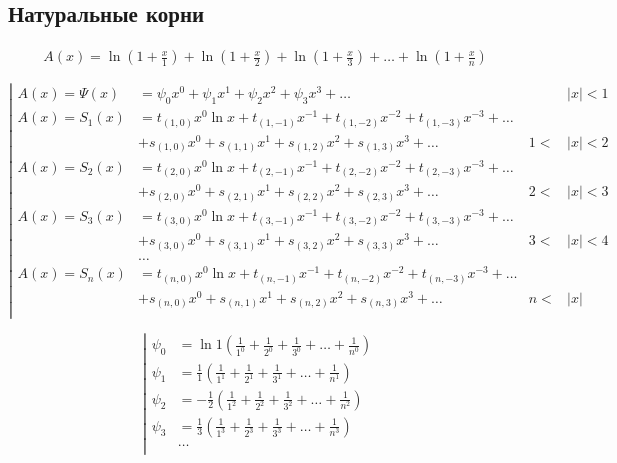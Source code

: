 
\subsection{Натуральные корни}

\begin{equation*} \begin{aligned}
&A(x) =
  \ln{\left(1 + \frac{x}{1} \right)}
+ \ln{\left(1 + \frac{x}{2} \right)}
+ \ln{\left(1 + \frac{x}{3} \right)}
+ \ldots
+ \ln{\left(1 + \frac{x}{n} \right)}
\end{aligned} \end{equation*}

\begin{equation*} \left| \begin{aligned}
A(x) = \Psi(x) &=
  \psi_0 x^0
+ \psi_1 x^1
+ \psi_2 x^2
+ \psi_3 x^3
+ \ldots &
&|x| < 1 \\
%
A(x) = S_1(x) &= 
  t_{(1,0)} x^0 \ln{x}
+ t_{(1,-1)} x^{-1}
+ t_{(1,-2)} x^{-2}
+ t_{(1,-3)} x^{-3}
+ \ldots \\ &
+ s_{(1,0)} x^0
+ s_{(1,1)} x^1
+ s_{(1,2)} x^2
+ s_{(1,3)} x^3
+ \ldots &
1 < &|x| < 2 \\
%
A(x) = S_2(x) &= 
  t_{(2,0)} x^0 \ln{x}
+ t_{(2,-1)} x^{-1}
+ t_{(2,-2)} x^{-2}
+ t_{(2,-3)} x^{-3}
+ \ldots \\ &
+ s_{(2,0)} x^0
+ s_{(2,1)} x^1
+ s_{(2,2)} x^2
+ s_{(2,3)} x^3
+ \ldots &
2 < &|x| < 3 \\
%
A(x) = S_3(x) &= 
  t_{(3,0)} x^0 \ln{x}
+ t_{(3,-1)} x^{-1}
+ t_{(3,-2)} x^{-2}
+ t_{(3,-3)} x^{-3}
+ \ldots \\ &
+ s_{(3,0)} x^0
+ s_{(3,1)} x^1
+ s_{(3,2)} x^2
+ s_{(3,3)} x^3
+ \ldots &
3 < &|x| < 4 \\
%
&\ldots \\
%
A(x) = S_n(x) &= 
  t_{(n,0)} x^0 \ln{x}
+ t_{(n,-1)} x^{-1}
+ t_{(n,-2)} x^{-2}
+ t_{(n,-3)} x^{-3}
+ \ldots \\ &
+ s_{(n,0)} x^0
+ s_{(n,1)} x^1
+ s_{(n,2)} x^2
+ s_{(n,3)} x^3
+ \ldots &
n < &|x| \\
\end{aligned} \right. \end{equation*}

\begin{equation*} \left| \begin{aligned}
\psi_0 &= \ln{1} \left(
  \frac{1}{1^0}
+ \frac{1}{2^0}
+ \frac{1}{3^0}
+ \ldots
+ \frac{1}{n^0} \right) \\
%
\psi_1 &= \frac{1}{1} \left(
  \frac{1}{1^1}
+ \frac{1}{2^1}
+ \frac{1}{3^1}
+ \ldots
+ \frac{1}{n^1} \right) \\
%
\psi_2 &= - \frac{1}{2} \left(
  \frac{1}{1^2}
+ \frac{1}{2^2}
+ \frac{1}{3^2}
+ \ldots
+ \frac{1}{n^2} \right) \\
%
\psi_3 &= \frac{1}{3} \left(
  \frac{1}{1^3}
+ \frac{1}{2^3}
+ \frac{1}{3^3}
+ \ldots
+ \frac{1}{n^3} \right) \\
%
&\ldots \\
\end{aligned} \right. \end{equation*}


